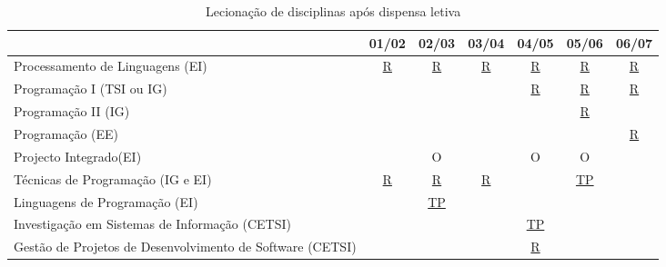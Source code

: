 \documentclass[11pt]{article}
\begin{document}
\begin{table}[h]
\scriptsize
\centering
    \begin{tabular}[h]{|l||c|c|c|c|c|c|}
      \hline
& 01/02 & 02/03 & 03/04 & 04/05 & 05/06 & 06/07\\
\hline
\hline
Processamento de Linguagens (EI) & \href{run:Disciplinas/Fichas/PL0102.pdf}{R} & \href{run:Disciplinas/Fichas/PL0203.pdf}{R} & \href{run:Disciplinas/Fichas/PL0304.pdf}{R} & \href{run:Disciplinas/Fichas/PL0405.pdf}{R} & \href{run:Disciplinas/Fichas/PL0506.pdf}{R} & \href{run:Disciplinas/Fichas/PL0607.pdf}{R} \\
\hline
Programação I (TSI ou IG) & & & & \href{run:Disciplinas/Fichas/ProgI0405.pdf}{R} & \href{run:Disciplinas/Fichas/ProgI0506.pdf}{R} & \href{run:Disciplinas/Fichas/ProgI0607.pdf}{R}\\
\hline
Programação II (IG) & & & & & \href{run:Disciplinas/Fichas/ProgII0506.pdf}{R} & \\
\hline
Programação (EE) & & & & & & \href{run:Disciplinas/Fichas/ProgEE0607.pdf}{R}\\
\hline
Projecto Integrado(EI) & & O & & O & O & \\
\hline
Técnicas de Programação (IG e EI) & \href{run:Disciplinas/Fichas/TP0102.pdf}{R} & \href{run:Disciplinas/Fichas/TP0203.pdf}{R} & \href{run:Disciplinas/Fichas/TP0304.pdf}{R} & & \href{run:Disciplinas/Fichas/TP0506P.pdf}{TP} & \\
\hline
Linguagens de Programação (EI) & & \href{run:Disciplinas/Fichas/LP0203.pdf}{TP} & & & & \\ 
\hline
Investigação em Sistemas de Informação (CETSI) & & & & \href{run:Disciplinas/Fichas/ISICETSI0405.pdf}{TP} & & \\ 
\hline
Gestão de Projetos de Desenvolvimento de Software (CETSI) & & & & \href{run:Disciplinas/Fichas/GPDSWCETSI0405.pdf}{R} & & \\ 
\hline
\end{tabular}
    \caption{Lecionação de disciplinas após dispensa letiva}
    \label{disciplinas2}
\normalsize
\end{table}
\end{document}

